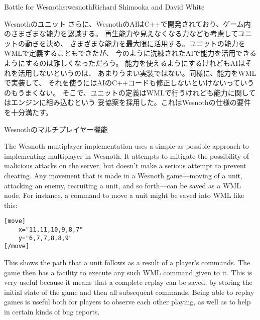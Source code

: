 \begin{aosachapter}{Battle for Wesnoth}{s:wesnoth}{Richard Shimooka and David White}
\begin{aosasect1}{Wesnothのユニット}
さらに、WesnothのAIはC++で開発されており、ゲーム内のさまざまな能力を認識する。
再生能力や見えなくなる力なども考慮してユニットの動きを決め、
さまざまな能力を最大限に活用する。ユニットの能力をWMLで定義することもできたが、
今のように洗練されたAIで能力を活用できるようにするのは難しくなっただろう。
能力を使えるようにするけれどもAIはそれを活用しないというのは、
あまりうまい実装ではない。同様に、能力をWMLで実装して、
それを使うにはAIのC++コードも修正しないといけないっていうのもうまくない。
そこで、ユニットの定義はWMLで行うけれども能力に関してはエンジンに組み込むという
妥協案を採用した。これはWesnothの仕様の要件を十分満たす。

\end{aosasect1}

\begin{aosasect1}{Wesnothのマルチプレイヤー機能}

The Wesnoth multiplayer implementation uses a simple-as-possible
approach to implementing multiplayer in Wesnoth. It attempts to
mitigate the possibility of malicious attacks on the server, but
doesn't make a serious attempt to prevent cheating.  Any movement that
is made in a Wesnoth game---moving of a unit, attacking an enemy,
recruiting a unit, and so forth---can be saved as a WML node. For
instance, a command to move a unit might be saved into WML like this:

\begin{verbatim}
[move]
    x="11,11,10,9,8,7"
    y="6,7,7,8,8,9"
[/move]
\end{verbatim}

\noindent This shows the path that a unit follows as a result of a player's
commands. The game then has a facility to execute any such WML command
given to it. This is very useful because it means that a complete
replay can be saved, by storing the initial state of the game and then
all subsequent commands. Being able to replay games is useful both for
players to observe each other playing, as well as to help in certain
kinds of bug reports.


\end{aosasect1}
\end{aosachapter}
